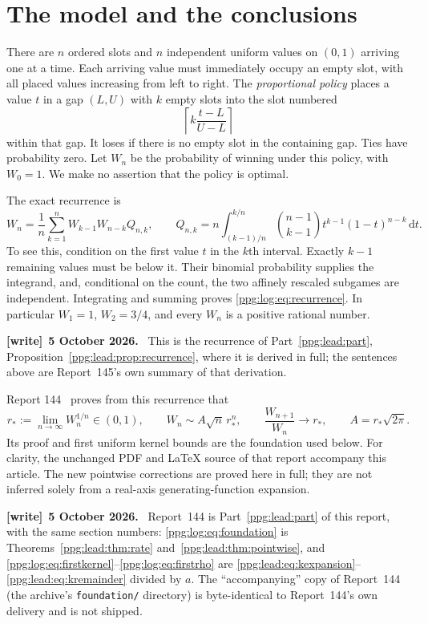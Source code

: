 \documentclass[11pt,letterpaper]{article}
\theoremstyle{remark}\newtheorem{remark}[theorem]{Remark}
\numberwithin{equation}{section}
\newcommand{\dd}{\mathrm d}
\newcommand{\file}[1]{\nolinkurl{#1}}
\newenvironment{writenote}[1][]{\par\smallskip\begingroup\small
 \noindent\textbf{[write]}\if\relax\detokenize{#1}\relax\else~\textbf{#1.}\fi\ }%
 {\par\endgroup\smallskip}
\begin{document}
\section{The model and the conclusions}\label{ppg:log:sec:model}
There are $n$ ordered slots and $n$ independent uniform values on $(0,1)$ arriving one at a time. Each arriving value must immediately occupy an empty slot, with all placed values increasing from left to right. The \emph{proportional policy} places a value $t$ in a gap $(L,U)$ with $k$ empty slots into the slot numbered
\[
 \left\lceil k\frac{t-L}{U-L}\right\rceil
\]
within that gap. It loses if there is no empty slot in the containing gap. Ties have probability zero. Let $W_n$ be the probability of winning under this policy, with $W_0=1$. We make no assertion that the policy is optimal.

The exact recurrence is
\begin{equation}\label{ppg:log:eq:recurrence}
 W_n=\frac1n\sum_{k=1}^n W_{k-1}W_{n-k}Q_{n,k},\qquad
 Q_{n,k}=n\int_{(k-1)/n}^{k/n}\binom{n-1}{k-1}
 t^{k-1}(1-t)^{n-k}\,\dd t.
\end{equation}
To see this, condition on the first value $t$ in the $k$th interval. Exactly $k-1$ remaining values must be below it. Their binomial probability supplies the integrand, and, conditional on the count, the two affinely rescaled subgames are independent. Integrating and summing proves \eqref{ppg:log:eq:recurrence}. In particular $W_1=1$, $W_2=3/4$, and every $W_n$ is a positive rational number.
\begin{writenote}[5 October 2026]
This is the recurrence of Part~\ref{ppg:lead:part}, Proposition~\ref{ppg:lead:prop:recurrence}, where it is derived in full; the sentences above are Report~145's own summary of that derivation.
\end{writenote}

Report 144~\cite{r144} proves from this recurrence that
\begin{equation}\label{ppg:log:eq:foundation}
 r_*:=\lim_{n\to\infty}W_n^{1/n}\in(0,1),\qquad
 W_n\sim A\sqrt n\,r_*^n,\qquad
 \frac{W_{n+1}}{W_n}\longrightarrow r_*,\qquad A=r_*\sqrt{2\pi}.
\end{equation}
Its proof and first uniform kernel bounds are the foundation used below. For clarity, the unchanged PDF and LaTeX source of that report accompany this article. The new pointwise corrections are proved here in full; they are not inferred solely from a real-axis generating-function expansion.
\begin{writenote}[5 October 2026]
Report~144 is Part~\ref{ppg:lead:part} of this report, with the same section numbers: \eqref{ppg:log:eq:foundation} is Theorems~\ref{ppg:lead:thm:rate} and~\ref{ppg:lead:thm:pointwise}, and \eqref{ppg:log:eq:firstkernel}--\eqref{ppg:log:eq:firstrho} are \eqref{ppg:lead:eq:kexpansion}--\eqref{ppg:lead:eq:kremainder} divided by $a$. The ``accompanying'' copy of Report~144 (the archive's \file{foundation/} directory) is byte-identical to Report~144's own delivery and is not shipped.
\end{writenote}
\end{document}
